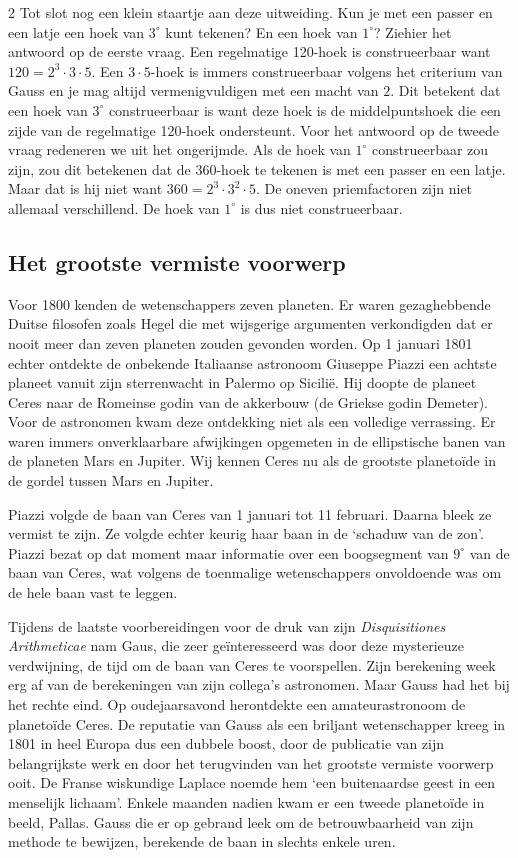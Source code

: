 \begin{multicols}{2}
	Tot slot nog een klein staartje aan deze uitweiding. Kun je met een passer en een latje een hoek van $3^\circ$ kunt tekenen? En een hoek van $1^\circ$? Ziehier het antwoord op de eerste vraag. Een regelmatige 120-hoek is construeerbaar want $120=2^3 \cdot 3 \cdot 5$. Een $3\cdot5$-hoek is immers construeerbaar volgens het criterium van Gauss en je mag altijd vermenigvuldigen met een macht van $2$. Dit betekent dat een hoek van $3^\circ$ construeerbaar is want deze hoek is de middelpuntshoek die een zijde van de regelmatige 120-hoek ondersteunt. Voor het antwoord op de tweede vraag redeneren we uit het ongerijmde. Als de hoek van $1^\circ$ construeerbaar zou zijn, zou dit betekenen dat de 360-hoek te tekenen is met een passer en een latje. Maar dat is hij niet want $360=2^3 \cdot 3^2 \cdot 5$. De oneven priemfactoren zijn niet allemaal verschillend. De hoek van $1^\circ$ is dus niet construeerbaar.
 
	\subsection*{Het grootste vermiste voorwerp}
	Voor 1800 kenden de wetenschappers zeven planeten. Er waren gezaghebbende Duitse filosofen zoals Hegel die met wijsgerige argumenten verkondigden dat er nooit meer dan zeven planeten zouden gevonden worden. Op 1 januari 1801 echter ontdekte de onbekende Italiaanse astronoom Giuseppe Piazzi een achtste planeet vanuit zijn sterrenwacht in Palermo op Sicilië. Hij doopte de planeet Ceres naar de Romeinse godin van de akkerbouw (de Griekse godin Demeter). Voor de astronomen kwam deze ontdekking niet als een volledige verrassing. Er waren immers onverklaarbare afwijkingen opgemeten in de ellipstische banen van de planeten Mars en Jupiter. Wij kennen Ceres nu als de grootste planetoïde in de gordel tussen Mars en Jupiter.
 
	Piazzi volgde de baan van Ceres van 1 januari tot 11 februari. Daarna bleek ze vermist te zijn. Ze volgde echter keurig haar baan in de `schaduw van de zon'. Piazzi bezat op dat moment maar informatie over een boogsegment van $9^\circ$ van de baan van Ceres, wat volgens de toenmalige wetenschappers onvoldoende was om de hele baan vast te leggen.
	
	Tijdens de laatste voorbereidingen voor de druk van zijn \emph{Disquisitiones Arithmeticae} nam Gaus, die zeer geïnteresseerd was door deze mysterieuze verdwijning, de tijd om de baan van Ceres te voorspellen. Zijn berekening week erg af van de berekeningen van zijn collega's astronomen. Maar Gauss had het bij het rechte eind. Op oudejaarsavond herontdekte een amateurastronoom de planetoïde Ceres. De reputatie van Gauss als een briljant wetenschapper kreeg in 1801 in heel Europa dus een dubbele boost, door de publicatie van zijn belangrijkste werk en door het terugvinden van het grootste vermiste voorwerp ooit. De Franse wiskundige Laplace noemde hem `een buitenaardse geest in een menselijk lichaam'. Enkele maanden nadien kwam er een tweede planetoïde in beeld, Pallas. Gauss die er op gebrand leek om de betrouwbaarheid van zijn methode te bewijzen, berekende de baan in slechts enkele uren.
 \end{multicols}
